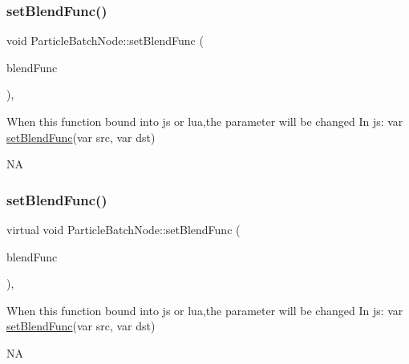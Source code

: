 \subsubsection{\texorpdfstring{set\+Blend\+Func()}{setBlendFunc()}\hspace{0.1cm}{\footnotesize\ttfamily [1/2]}}
{\footnotesize\ttfamily void Particle\+Batch\+Node\+::set\+Blend\+Func (\begin{DoxyParamCaption}\item[{const \hyperlink{structBlendFunc}{Blend\+Func} \&}]{blend\+Func }\end{DoxyParamCaption})\hspace{0.3cm}{\ttfamily [override]}, {\ttfamily [virtual]}}


\begin{DoxyCode}
When \textcolor{keyword}{this} \textcolor{keyword}{function} bound into js or lua,the parameter will be changed
In js: var \hyperlink{classParticleBatchNode_a00b968ce81dedae01d543bf3772cd91a}{setBlendFunc}(var src, var dst)
\end{DoxyCode}
  NA \mbox{\label{classParticleBatchNode_aa5f56df9acedf2a1446f63e93637126b}} 
\subsubsection{\texorpdfstring{set\+Blend\+Func()}{setBlendFunc()}\hspace{0.1cm}{\footnotesize\ttfamily [2/2]}}
{\footnotesize\ttfamily virtual void Particle\+Batch\+Node\+::set\+Blend\+Func (\begin{DoxyParamCaption}\item[{const \hyperlink{structBlendFunc}{Blend\+Func} \&}]{blend\+Func }\end{DoxyParamCaption})\hspace{0.3cm}{\ttfamily [override]}, {\ttfamily [virtual]}}


\begin{DoxyCode}
When \textcolor{keyword}{this} \textcolor{keyword}{function} bound into js or lua,the parameter will be changed
In js: var \hyperlink{classParticleBatchNode_a00b968ce81dedae01d543bf3772cd91a}{setBlendFunc}(var src, var dst)
\end{DoxyCode}
  NA \mbox{\label{classParticleBatchNode_a67fa60ccb7be07438228ea461682a483}} 
